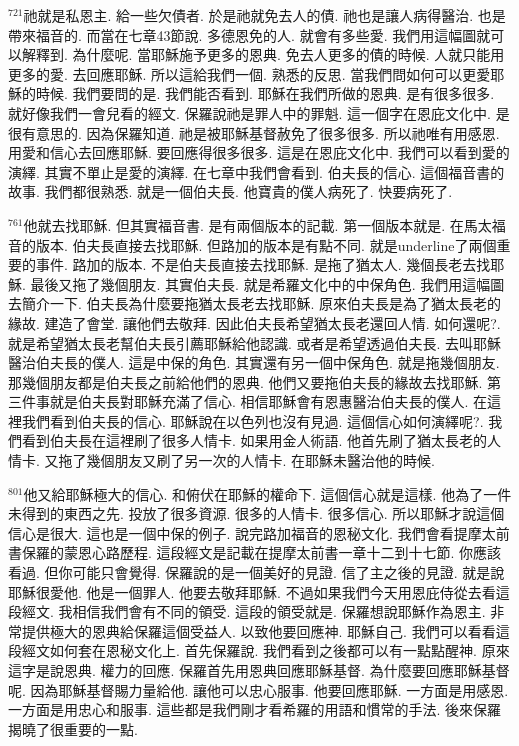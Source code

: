 \documentclass{book}
\begin{document}
$^{721}$祂就是私恩主.
給一些欠債者.
於是祂就免去人的債.
祂也是讓人病得醫治.
也是帶來福音的.
而當在七章43節說.
多德恩免的人.
就會有多些愛.
我們用這幅圖就可以解釋到.
為什麼呢.
當耶穌施予更多的恩典.
免去人更多的債的時候.
人就只能用更多的愛.
去回應耶穌.
所以這給我們一個.
熟悉的反思.
當我們問如何可以更愛耶穌的時候.
我們要問的是.
我們能否看到.
耶穌在我們所做的恩典.
是有很多很多.
就好像我們一會兒看的經文.
保羅說祂是罪人中的罪魁.
這一個字在恩庇文化中.
是很有意思的.
因為保羅知道.
祂是被耶穌基督赦免了很多很多.
所以祂唯有用感恩.
用愛和信心去回應耶穌.
要回應得很多很多.
這是在恩庇文化中.
我們可以看到愛的演繹.
其實不單止是愛的演繹.
在七章中我們會看到.
伯夫長的信心.
這個福音書的故事.
我們都很熟悉.
就是一個伯夫長.
他寶貴的僕人病死了.
快要病死了.

$^{761}$他就去找耶穌.
但其實福音書.
是有兩個版本的記載.
第一個版本就是.
在馬太福音的版本.
伯夫長直接去找耶穌.
但路加的版本是有點不同.
就是underline了兩個重要的事件.
路加的版本.
不是伯夫長直接去找耶穌.
是拖了猶太人.
幾個長老去找耶穌.
最後又拖了幾個朋友.
其實伯夫長.
就是希羅文化中的中保角色.
我們用這幅圖去簡介一下.
伯夫長為什麼要拖猶太長老去找耶穌.
原來伯夫長是為了猶太長老的緣故.
建造了會堂.
讓他們去敬拜.
因此伯夫長希望猶太長老還回人情.
如何還呢?.
就是希望猶太長老幫伯夫長引薦耶穌給他認識.
或者是希望透過伯夫長.
去叫耶穌醫治伯夫長的僕人.
這是中保的角色.
其實還有另一個中保角色.
就是拖幾個朋友.
那幾個朋友都是伯夫長之前給他們的恩典.
他們又要拖伯夫長的緣故去找耶穌.
第三件事就是伯夫長對耶穌充滿了信心.
相信耶穌會有恩惠醫治伯夫長的僕人.
在這裡我們看到伯夫長的信心.
耶穌說在以色列也沒有見過.
這個信心如何演繹呢?.
我們看到伯夫長在這裡刷了很多人情卡.
如果用金人術語.
他首先刷了猶太長老的人情卡.
又拖了幾個朋友又刷了另一次的人情卡.
在耶穌未醫治他的時候.

$^{801}$他又給耶穌極大的信心.
和俯伏在耶穌的權命下.
這個信心就是這樣.
他為了一件未得到的東西之先.
投放了很多資源.
很多的人情卡.
很多信心.
所以耶穌才說這個信心是很大.
這也是一個中保的例子.
說完路加福音的恩秘文化.
我們會看提摩太前書保羅的蒙恩心路歷程.
這段經文是記載在提摩太前書一章十二到十七節.
你應該看過.
但你可能只會覺得.
保羅說的是一個美好的見證.
信了主之後的見證.
就是說耶穌很愛他.
他是一個罪人.
他要去敬拜耶穌.
不過如果我們今天用恩庇侍從去看這段經文.
我相信我們會有不同的領受.
這段的領受就是.
保羅想說耶穌作為恩主.
非常提供極大的恩典給保羅這個受益人.
以致他要回應神.
耶穌自己.
我們可以看看這段經文如何套在恩秘文化上.
首先保羅說.
我們看到之後都可以有一點點醒神.
原來這字是說恩典.
權力的回應.
保羅首先用恩典回應耶穌基督.
為什麼要回應耶穌基督呢.
因為耶穌基督賜力量給他.
讓他可以忠心服事.
他要回應耶穌.
一方面是用感恩.
一方面是用忠心和服事.
這些都是我們剛才看希羅的用語和慣常的手法.
後來保羅揭曉了很重要的一點.
\end{document}
